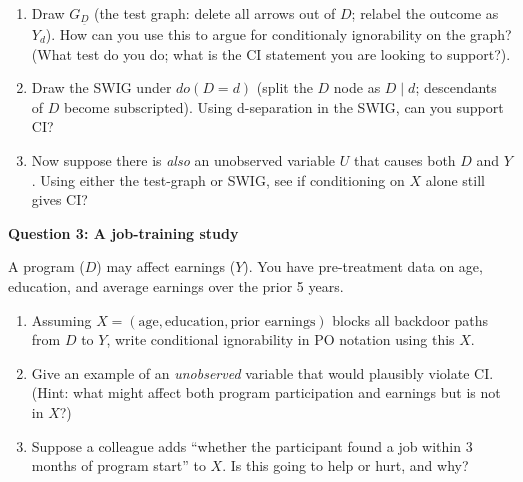 \documentclass[11pt]{article}
\begin{document}
\begin{enumerate}[label=(\alph*)]
\item Draw $G_{\underline{D}}$ (the test graph: delete all arrows out of $D$; relabel the outcome as $Y_d$). How can you use this to argue for conditionaly ignorability on the graph? (What test do you do; what is the CI statement you are looking to support?).

\clearpage

\item Draw the SWIG under $do(D=d)$ (split the $D$ node as $D \mid d$; descendants of $D$ become subscripted).  Using d-separation in the SWIG, can you support CI? 

\vspace{3.0cm}

\item Now suppose there is \emph{also} an unobserved variable $U$ that causes both $D$ and $Y$.  Using either the test-graph or SWIG, see if conditioning on $X$ alone still gives CI? 

\vspace{2.5cm}
\end{enumerate}

\medskip

\noindent\textbf{Question 3: A job-training study}

\medskip
\noindent A program ($D$) may affect earnings ($Y$).  You have pre-treatment data on age, education, and average earnings over the prior 5 years.

\begin{enumerate}[label=(\alph*)]
\item Assuming $X = (\text{age}, \text{education}, \text{prior earnings})$ blocks all backdoor paths from $D$ to $Y$, write conditional ignorability in PO notation using this $X$.

\vspace{2cm}

\item Give an example of an \textit{unobserved} variable that would plausibly violate CI.  (Hint: what might affect both program participation and earnings but is not in $X$?)

\vspace{2cm}

\item Suppose a colleague adds ``whether the participant found a job within 3 months of program start'' to $X$.  Is this going to help or hurt, and why?

\vspace{1.1cm}
\end{enumerate}
\end{document}

